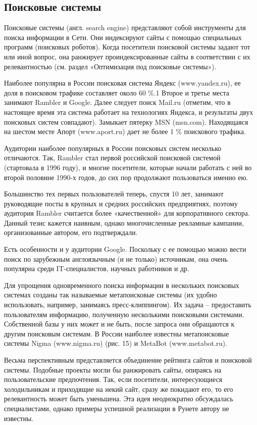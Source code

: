 \documentclass[a4paper,english,russian]{G2-105}
\begin{document}
\subsection{Поисковые системы}
\par Поисковые системы (англ. search engine)  представляют собой инструменты для поиска информации в Сети. Они индексируют сайты с помощью специальных программ (поисковых роботов). Когда посетители поисковой системы задают тот или иной вопрос, она ранжирует проиндексированные сайты в соответствии с их релевантностью (см. раздел «Оптимизация под поисковые системы»).
\par Наиболее популярна в России поисковая система Яндекс (www.yandex.ru), ее доля в поисковом трафике составляет около 60 \%.1 Второе и третье места занимают Rambler и Google. Далее следует поиск Mail.ru (отметим, что в настоящее время эта система работает на технологиях Яндекса, и результаты двух поисковых систем совпадают). Замыкает пятерку MSN (msn.com). Находящаяся на шестом месте Апорт (www.aport.ru) дает не более 1 \%  поискового трафика.
\par Аудитории наиболее популярных в России поисковых систем несколько отличаются. Так, Rambler стал первой российской поисковой системой (стартовала в 1996 году), и многие посетители, которые начали работать с ней во второй половине 1990-х годов, до сих пор продолжают пользоваться именно ею.
\par Большинство тех первых пользователей теперь, спустя 10 лет, занимают руководящие посты в крупных и средних российских предприятиях, поэтому аудитория Rambler считается более «качественной» для корпоративного сектора. Данный тезис кажется наивным, однако многочисленные рекламные кампании, организованные автором, его подтверждали.
\par Есть особенности и у аудитории Google. Поскольку с ее помощью можно вести поиск по зарубежным англоязычным (и не только) источникам, она очень популярна среди IT-специалистов, научных работников и др.
\par Для упрощения одновременного поиска информации в нескольких поисковых системах созданы так называемые метапоисковые системы (их удобно использовать, например, занимаясь пресс-клиппингом). Их задача – предоставить пользователям информацию, полученную несколькими поисковыми системами. Собственной базы у них может и не быть, после запроса они обращаются к другим поисковым системам. В России наиболее известны метапоисковые системы Nigma  (www.nigma.ru) (рис. 15) и MetaBot  (www.metabot.ru).
\par Весьма перспективным представляется объединение рейтинга сайтов и поисковой системы. Подобные проекты могли бы ранжировать сайты, опираясь на пользовательские предпочтения. Так, если посетители, интересующиеся холодильникам и приходящие на некий сайт, сразу же покидают его, то его релевантность может быть уменьшена. Эта идея неоднократно обсуждалась специалистами, однако примеры успешной реализации в Рунете автору не известны.
\end{document}
